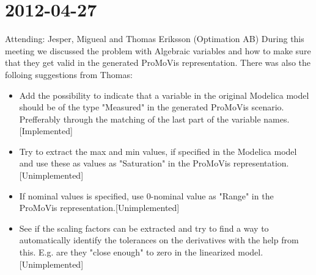 \section{2012-04-27}
Attending: Jesper, Migueal and Thomas Eriksson (Optimation AB)
During this meeting we discussed the problem with Algebraic variables and how to make sure that they get valid in the generated ProMoVis representation. There was also the folloing suggestions from Thomas:
\begin{itemize}
\item Add the possibility to indicate that a variable in the original Modelica model should be of the type "Measured" in the generated ProMoVis scenario. Prefferably through the matching of the last part of the variable names.[Implemented]
\item Try to extract the max and min values, if specified in the Modelica model and use these as values as "Saturation" in the ProMoVis representation. [Unimplemented]
\item If nominal values is specified, use 0-nominal value as "Range" in the ProMoVis representation.[Unimplemented]
\item See if the scaling factors can be extracted and try to find a way to automatically identify the tolerances on the derivatives with the help from this. E.g. are they "close enough" to zero in the linearized model.[Unimplemented]
\end{itemize}